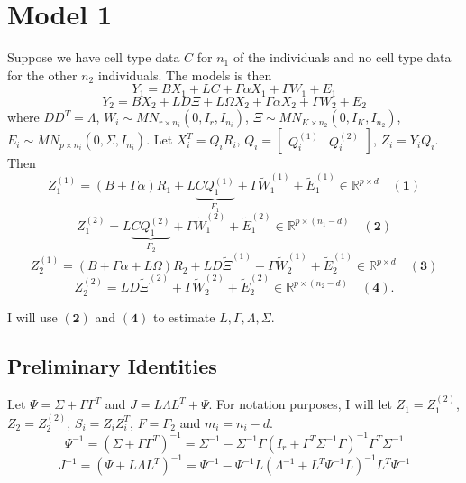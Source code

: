 \documentclass{article}
\begin{document}
\section{Model 1}

Suppose we have cell type data $C$ for $n_1$ of the individuals and no cell type data for the other $n_2$ individuals. The models is then
\[
Y_1 = BX_1 + LC + \Gamma\alpha X_1 + \Gamma W_1 + E_1
\]
\[
Y_2 = BX_2 + LD\Xi + L\Omega X_2 + \Gamma \alpha X_2 + \Gamma W_2 + E_2
\]
where $DD^T = \Lambda$, $W_i \sim MN_{r \times n_i}\left( 0, I_r, I_{n_i} \right)$, $\Xi \sim MN_{K \times n_2}\left( 0, I_K, I_{n_2} \right)$, $E_i \sim MN_{p \times n_i}\left( 0, \Sigma, I_{n_i} \right)$. Let $X_i^T = Q_i R_i$, $Q_i = \left[\begin{matrix}
Q_i^{(1)} & Q_i^{(2)}
\end{matrix}\right]$, $Z_i = Y_i Q_i$. Then
\[
Z_1^{(1)} = \left( B + \Gamma \alpha \right) R_1 + L\underbrace{CQ_1^{(1)}}_{F_1} + \Gamma \tilde{W}_1^{(1)} + \tilde{E}_1^{(1)} \in \mathbb{R}^{p \times d} \quad \bm{(1)}
\]
\[
Z_1^{(2)} = L\underbrace{CQ_1^{(2)}}_{F_2} + \Gamma \tilde{W}_1^{(2)} + \tilde{E}_1^{(2)} \in \mathbb{R}^{p \times \left( n_1 - d \right)} \quad \bm{(2)}
\]
\[
Z_2^{(1)} = \left( B + \Gamma \alpha + L\Omega \right) R_2 + LD\tilde{\Xi}^{(1)} + \Gamma \tilde{W}_2^{(1)} + \tilde{E}_2^{(1)} \in \mathbb{R}^{p \times d} \quad \bm{(3)}
\]
\[
Z_2^{(2)} = LD\tilde{\Xi}^{(2)} + \Gamma \tilde{W}_2^{(2)} + \tilde{E}_2^{(2)} \in \mathbb{R}^{p \times \left( n_2 - d \right)} \quad \bm{(4)}.
\]

I will use $\bm{(2)}$ and $\bm{(4)}$ to estimate $L, \Gamma, \Lambda, \Sigma$.

\subsection{Preliminary Identities}
Let $\Psi = \Sigma + \Gamma\Gamma^T$ and $J = L\Lambda L^T + \Psi$. For notation purposes, I will let $Z_1 = Z_1^{(2)}$, $Z_2 = Z_2^{(2)}$, $S_i = Z_i Z_i^T$, $F = F_2$ and $m_i = n_i - d$.
\[
\Psi^{-1} = \left( \Sigma + \Gamma\Gamma^T \right)^{-1} = \Sigma^{-1} - \Sigma^{-1}\Gamma\left( I_r + \Gamma^T \Sigma^{-1}\Gamma \right)^{-1}\Gamma^T \Sigma^{-1}
\]
\[
J^{-1} = \left( \Psi + L\Lambda L^T \right)^{-1} = \Psi^{-1} - \Psi^{-1}L\left( \Lambda^{-1} + L^T \Psi^{-1} L \right)^{-1} L^T \Psi^{-1}
\]
\end{document}
